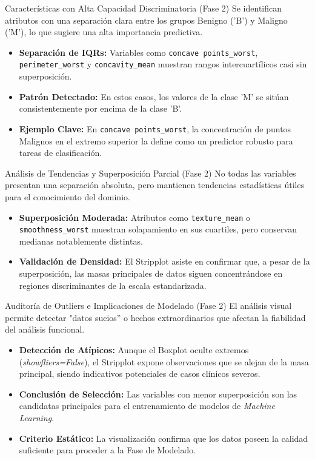 \documentclass{beamer}
\begin{document}
	
	\begin{frame}{Características con Alta Capacidad Discriminatoria (Fase 2)}
		Se identifican atributos con una separación clara entre los grupos Benigno ('B') y Maligno ('M'), lo que sugiere una alta importancia predictiva.
		
		\begin{itemize}
			\item<2-> \textbf{Separación de IQRs:} Variables como \texttt{concave points\_worst}, \texttt{perimeter\_worst} y \texttt{concavity\_mean} muestran rangos intercuartílicos casi sin superposición.
			\item<3-> \textbf{Patrón Detectado:} En estos casos, los valores de la clase 'M' se sitúan consistentemente por encima de la clase 'B'.
			\item<4-> \textbf{Ejemplo Clave:} En \texttt{concave points\_worst}, la concentración de puntos Malignos en el extremo superior la define como un predictor robusto para tareas de clasificación.
		\end{itemize}
	\end{frame}
	
	\begin{frame}{Análisis de Tendencias y Superposición Parcial (Fase 2)}
		No todas las variables presentan una separación absoluta, pero mantienen tendencias estadísticas útiles para el conocimiento del dominio.
		
		\begin{itemize}
			\item<2-> \textbf{Superposición Moderada:} Atributos como \texttt{texture\_mean} o \texttt{smoothness\_worst} muestran solapamiento en sus cuartiles, pero conservan medianas notablemente distintas.
			\item<3-> \textbf{Validación de Densidad:} El Stripplot asiste en confirmar que, a pesar de la superposición, las masas principales de datos siguen concentrándose en regiones discriminantes de la escala estandarizada.
		\end{itemize}
	\end{frame}
	
	\begin{frame}{Auditoría de Outliers e Implicaciones de Modelado (Fase 2)}
		El análisis visual permite detectar "datos sucios'' o hechos extraordinarios que afectan la fiabilidad del análisis funcional.
		
		\begin{itemize}
			\item<2-> \textbf{Detección de Atípicos:} Aunque el Boxplot oculte extremos (\textit{showfliers=False}), el Stripplot expone observaciones que se alejan de la masa principal, siendo indicativos potenciales de casos clínicos severos.
			\item<3-> \textbf{Conclusión de Selección:} Las variables con menor superposición son las candidatas principales para el entrenamiento de modelos de \textit{Machine Learning}.
			\item<4-> \textbf{Criterio Estático:} La visualización confirma que los datos poseen la calidad suficiente para proceder a la Fase de Modelado.
		\end{itemize}
	\end{frame}
	
\end{document}

